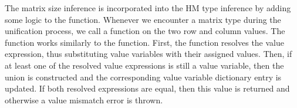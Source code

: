 The matrix size inference is incorporated into the HM type inference by adding some logic to the  function.
Whenever we encounter a matrix type during the unification process, we call a  function on the two row and column values.
The  function works similarly to the  function.
First, the function resolves the value expression, thus substituting value variables with their assigned values.
Then, if at least one of the resolved value expressions is still a value variable, then the union is constructed and the corresponding value variable dictionary entry is updated.
If both resolved expressions are equal, then this value is returned and otherwise a value mismatch error is thrown.